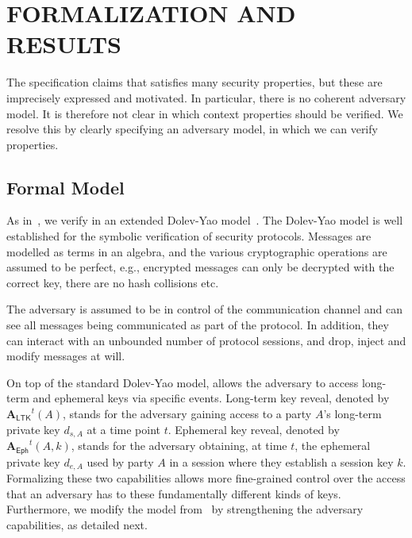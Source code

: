 \documentclass[runningheads]{llncs}
\newcommand{\mFunStyle}[1]{\textsf{#1}}
\newcommand{\mProtocolStyle}[1]{\text{#1}}
\newcommand{\mSpec}{specification}  %
\newcommand{\mRevLTK}{\ensuremath{\mathbf{A}_\mFunStyle{LTK}}}
\newcommand{\mRevEph}{\ensuremath{\mathbf{A}_\mFunStyle{Eph}}}
\newcommand{\mEdhoc}{\mProtocolStyle{EDHOC}}
\newcommand{\mPriv}[1]{\ensuremath{d_{s,#1}}}
\newcommand{\mPrivE}[1]{\ensuremath{d_{e,#1}}}
\begin{document}
\section{\uppercase{Formalization and Results}}
\label{sec:formalization}
The \mEdhoc{} \mSpec{} \cite{our-analysis-selander-lake-edhoc-00} claims
that \mEdhoc{} satisfies many security properties, but these are imprecisely
expressed and motivated.
%
In particular, there is no coherent adversary model.
%
It is therefore not clear in which context properties should be verified.
%
We resolve this by clearly specifying an adversary model, in which we can 
verify
properties.
%

\subsection{Formal Model}\label{sec:threat-model}
As in~\cite{Norr21}, we verify \mEdhoc{} in an extended
Dolev-Yao model~\cite{DY83}.
%
The Dolev-Yao model is well established for the symbolic verification of 
security
protocols.
%
Messages are modelled as terms in an algebra, and the various cryptographic
operations are assumed to be perfect, e.g., encrypted messages can only be
decrypted with the correct key, there are no hash collisions etc.
%

The adversary is assumed to be in control of the communication
channel and can see all messages being communicated as part of the protocol.
%
In addition, they can interact with an unbounded number of protocol sessions,
and drop, inject and modify messages at will.
%

On top of the standard Dolev-Yao model, \cite{Norr21} allows the adversary to
access long-term and ephemeral keys via specific events.
%
Long-term key reveal, denoted by $\mRevLTK^{t}(A)$, stands for the adversary
gaining access to a party $A$'s long-term private key \mPriv{A} at a time point 
$t$.
%
Ephemeral key reveal, denoted by $\mRevEph^{t}(A, k)$, stands for the 
adversary
obtaining, at time $t$, the ephemeral private key \mPrivE{A} used by party $A$
in a session where they establish a session key $k$.
%
Formalizing these two capabilities allows more fine-grained control
over the access that an adversary has to these fundamentally different kinds of
keys.
%
Furthermore, we modify the model from~\cite{Norr21} by strengthening the
adversary capabilities, as detailed next.
%
\end{document}
